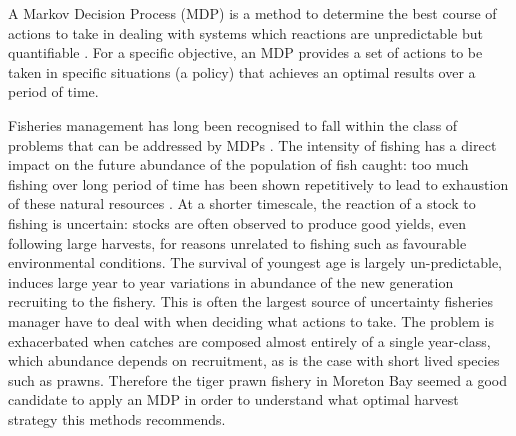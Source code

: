A Markov Decision Process (MDP) is a method to determine the best course of actions to take in dealing with systems which reactions are unpredictable but quantifiable \citep{Puterman1994}. For a specific objective, an MDP provides a set of actions to be taken in specific situations (a policy) that achieves an optimal results over a period of time.

Fisheries management has long been recognised to fall within the class of problems that can be addressed by MDPs \citep{walters1986adaptive}. The intensity of fishing has a direct impact on the future abundance of the population of fish caught: too much fishing over long period of time has been shown repetitively to lead to exhaustion of these natural resources \citep{hilborn2011overfishing}. At a shorter timescale, the reaction of a stock to fishing is uncertain: stocks are often observed to produce good yields, even following large harvests, for reasons unrelated to fishing such as favourable environmental conditions. The survival of youngest age is largely un-predictable, induces large year to year variations in abundance of the new generation recruiting to the fishery. This is often the largest source of uncertainty fisheries manager have to deal with when deciding what actions to take. The problem is exhacerbated when catches are composed almost entirely of a single year-class, which abundance depends on recruitment, as is the case with short lived species such as prawns. Therefore the tiger prawn fishery in Moreton Bay seemed a good candidate to apply an MDP in order to understand what optimal harvest strategy this methods recommends.

